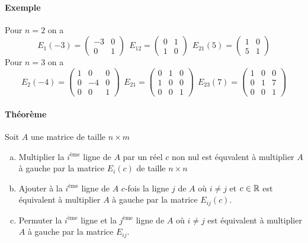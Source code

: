 \paragraph{Exemple} Pour $n = 2$ on a
$$E_1(-3) = \begin{pmatrix} -3 & 0 \\ 0 & 1 \end{pmatrix} ~~ 
  E_{1 2} = \begin{pmatrix} 0 & 1 \\ 1 &  0 \end{pmatrix} ~~ 
  E_{2 1}(5) = \begin{pmatrix} 1 & 0 \\ 5 & 1 \end{pmatrix}$$
Pour $n = 3$ on a
$$E_2(-4) = \begin{pmatrix} 1 & 0 & 0 \\ 0 & -4 & 0 \\ 0 & 0 & 1 \end{pmatrix} ~~
  E_{2 1} = \begin{pmatrix} 0 & 1 & 0 \\ 1 & 0 & 0 \\ 0 & 0 & 1 \end{pmatrix} ~~
  E_{2 3}(7) = \begin{pmatrix} 1 & 0 & 0 \\ 0 & 1 & 7 \\ 0 & 0 & 1 \end{pmatrix}$$

\paragraph{Théorème} Soit $A$ une matrice de taille $n\times m$
\begin{enumerate}[a)]
  \item Multiplier la $i^{\text{ème}}$ ligne de $A$ par un réel $c$ non nul est équvalent à multiplier $A$ à gauche par la matrice $E_i(c)$ de taille $n \times n$
  
  \item Ajouter à la $i^{\text{ème}}$ ligne de $A$ $c$-fois la ligne $j$ de $A$ où $i\neq j$ et $c\in \mathbb{R}$ est équivalent à multiplier $A$ à gauche par la matrice $E_{ij}(c)$.
  
  \item Permuter la $i^{\text{ème}}$ ligne et la $j^{\text{ème}}$ ligne de $A$ où $i\neq j$ est équivalent à multiplier $A$ à gauche par la matrice $E_{ij}$.
\end{enumerate}

